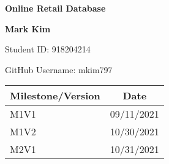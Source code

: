 \begin{titlepage}
\begin{center}
	\vspace*{1cm}
	\Huge
	\textbf{Online Retail Database}
	
	\vspace{1.5cm}
	\LARGE
	\textbf{Mark Kim}
	
	\Large
	Student ID: 918204214
	
	GitHub Username: mkim797
	
	\large
	\vspace{1cm}
	\begin{tabular}{ | l | c | }
		\hline
		\textbf{Milestone/Version} & \textbf{Date}\\
		\hline
		M1V1 & 09/11/2021\\
		M1V2 & 10/30/2021\\
		M2V1 & 10/31/2021\\
		\hline
	\end{tabular}

\end{center}
\end{titlepage}